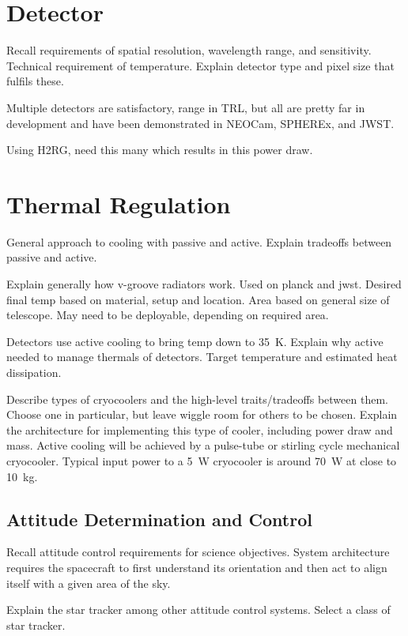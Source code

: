 \documentclass{ws-jai}
\begin{document}
\section{Detector}
\label{S:detector}
Recall requirements of spatial resolution, wavelength range, and sensitivity. Technical requirement of temperature. Explain detector type and pixel size that fulfils these.

Multiple detectors are satisfactory, range in TRL, but all are pretty far in development and have been demonstrated in NEOCam, SPHEREx, and JWST\@.

Using H2RG, need this many which results in this power draw.

\section{Thermal Regulation}
\label{S:tempregulation}
General approach to cooling with passive and active. Explain tradeoffs between passive and active.

Explain generally how v-groove radiators work.
Used on planck and jwst.
Desired final temp based on material, setup and location.
Area based on general size of telescope.
May need to be deployable, depending on required area.

Detectors use active cooling to bring temp down to \SI{35}{\kelvin}.
Explain why active needed to manage thermals of detectors.
Target temperature and estimated heat dissipation.

Describe types of cryocoolers and the high-level traits/tradeoffs between them. Choose one in particular, but leave wiggle room for others to be chosen.
Explain the architecture for implementing this type of cooler, including power draw and mass.
Active cooling will be achieved by a pulse-tube or stirling cycle mechanical cryocooler.
Typical input power to a \SI{5}{\watt} cryocooler is around \SI{70}{\watt} at close to \SI{10}{\kilo\gram}.

\subsection{Attitude Determination and Control}
\label{sS:adcs}
Recall attitude control requirements for science objectives.
System architecture requires the spacecraft to first understand its orientation and then act to align itself with a given area of the sky.

Explain the star tracker among other attitude control systems.
Select a class of star tracker.
\end{document}
